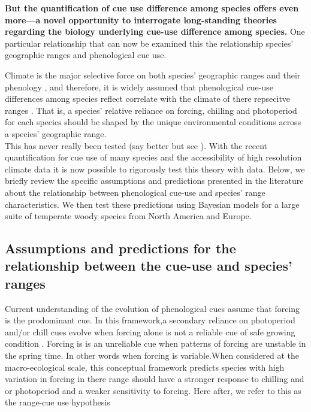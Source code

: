 \documentclass[11pt]{article}\usepackage[]{graphicx}\usepackage[]{color}
\begin{document}
\textbf{ But the quantification of cue use difference among species offers even more---a novel opportunity to interrogate long-standing theories regarding the biology underlying cue-use difference among species.} One particular relationship that can now be examined this the relationship species' geographic ranges and phenological cue use.

Climate is the major selective force on both species' geographic ranges \citep{} and their phenology \citep{}, and therefore, it is widely assumed that phenological cue-use differences among species reflect correlate with the climate of there repsecitve ranges \citep{}. That is, a species' relative reliance on forcing, chilling and photoperiod for each species should be shaped by the unique environmental conditions across a species' geographic range.\\

This has never really been tested (say better but see \citep{Zohner:2017aa}). With the recent quantification for cue use of many species \citep{} and the accessibility of high resolution climate data it is now possible to rigorously test this theory with data. Below, we briefly review the specific assumptions and predictions presented in the literature about the relationship between phenological cue-use and species' range characteristics. We then test these predictions using Bayesian models for a large suite of temperate woody species from North America and Europe.


\subsection*{Assumptions and predictions for the relationship between the cue-use and species' ranges}

Current understanding of the evolution of phenological cues assume that forcing is the prodominant cue. In this framework,a secondary reliance on photoperiod and/or chill cues evolve when forcing alone is not a reliable cue of safe growing condition \citep{Korner:2010aa}. Forcing is is an unreliable cue when patterns of forcing are unstable in the spring time. In other words when forcing is variable.When considered at the macro-ecological scale, this conceptual framework predicts species with high variation in forcing in there range should have a stronger response to chilling and or photoperiod and a weaker sensitivity to forcing. Here after, we refer to this as the range-cue use hypothesis\\
\end{document}
